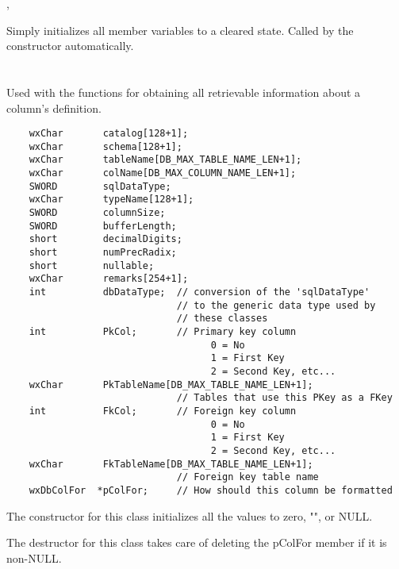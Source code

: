 
, 


\label{wxdbcoldefinitialize}

Simply initializes all member variables to a cleared state.  Called by 
the constructor automatically.


\section{}\label{wxdbcolinf}

Used with the  functions for obtaining all retrievable information about a column's definition.

\begin{verbatim}
    wxChar       catalog[128+1];
    wxChar       schema[128+1];
    wxChar       tableName[DB_MAX_TABLE_NAME_LEN+1];
    wxChar       colName[DB_MAX_COLUMN_NAME_LEN+1];
    SWORD        sqlDataType;
    wxChar       typeName[128+1];
    SWORD        columnSize;
    SWORD        bufferLength;
    short        decimalDigits;
    short        numPrecRadix;
    short        nullable;
    wxChar       remarks[254+1];
    int          dbDataType;  // conversion of the 'sqlDataType' 
                              // to the generic data type used by 
                              // these classes
    int          PkCol;       // Primary key column
                                    0 = No
                                    1 = First Key
                                    2 = Second Key, etc...
    wxChar       PkTableName[DB_MAX_TABLE_NAME_LEN+1];
                              // Tables that use this PKey as a FKey
    int          FkCol;       // Foreign key column
                                    0 = No
                                    1 = First Key
                                    2 = Second Key, etc...
    wxChar       FkTableName[DB_MAX_TABLE_NAME_LEN+1]; 
                              // Foreign key table name
    wxDbColFor  *pColFor;     // How should this column be formatted
\end{verbatim}

The constructor for this class initializes all the values to zero, "", or NULL.

The destructor for this class takes care of deleting the pColFor member if 
it is non-NULL.


\label{wxdbcolinfinitialize}

